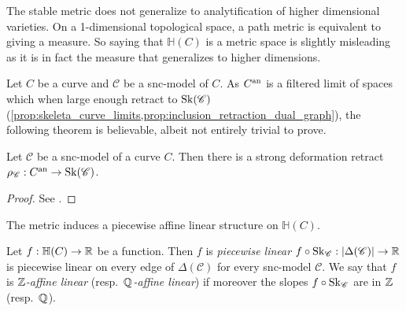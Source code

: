 \begin{remark}
	The stable metric does not generalize to analytification of higher dimensional varieties. 
	On a 1-dimensional topological space, a path metric is equivalent to giving a measure. 
	So saying that $\mathbb{H}(C)$ is a metric space is slightly misleading as it is in fact the measure that generalizes to higher dimensions. 
\end{remark}

Let $C$ be a curve and $\mathscr C$ be a snc-model of $C$. 
As $C{}^{\text{an}}$ is a filtered limit of spaces which when large enough retract to $\operatorname{Sk}(\mathscr C)$ (\cref{prop:skeleta_curve_limits,prop:inclusion_retraction_dual_graph}), the following theorem is believable, albeit not entirely trivial to prove. 
\begin{proposition}\label{prop:retract_analytification_skeleton}
	Let $\mathscr C$ be a snc-model of a curve $C$. 
	Then there is a strong deformation retract $\rho_{\mathscr C}: C{}^{\text{an}} \to \operatorname{Sk}(\mathscr C)$. 
\end{proposition}
\begin{proof}
	See \cite[§2.2.2]{bakerWeightFunctionsBerkovich2016}.
\end{proof}

The metric induces a piecewise affine linear structure on $\mathbb{H}(C)$. 
\begin{definition}
	Let $f: \mathbb{H}(C) \to \mathbb{R}$ be a function. 
	Then $f$ is \emph{piecewise linear} $f \circ \operatorname{Sk}_{\mathscr C}: |\Delta(\mathscr C)| \to \mathbb{R}$ is piecewise linear on every edge of $ \Delta(\mathscr C)$ for every snc-model $\mathscr C$. 
	We say that $f$ is \emph{$\mathbb{Z}$-affine linear} (resp.\ \emph{$\mathbb{Q}$-affine linear}) if moreover the slopes $f \circ \operatorname{Sk} _{\mathscr C}$ are in $\mathbb{Z} $ (resp.\ $\mathbb{Q}$).
\end{definition}



